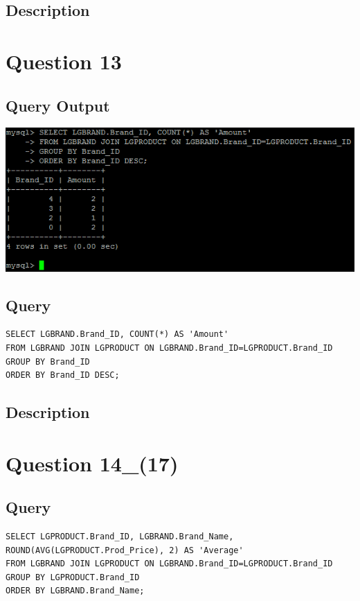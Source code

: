 \documentclass[a4paper,10pt]{article}
\begin{document}
\subsection{Description}
\section*{Question 13}
\subsection{Query Output}
           \includegraphics{Queries/Question_13/Question_13_screenshot.PNG}
 \subsection{Query}
          \lstset{
            language=SQL,
            breaklines=true
            }
        \begin{lstlisting}[frame=single]
        SELECT LGBRAND.Brand_ID, COUNT(*) AS 'Amount'
FROM LGBRAND JOIN LGPRODUCT ON LGBRAND.Brand_ID=LGPRODUCT.Brand_ID
GROUP BY Brand_ID
ORDER BY Brand_ID DESC;

        \end{lstlisting}
\subsection{Description}
\section*{Question 14_(17)}
 \subsection{Query}
          \lstset{
            language=SQL,
            breaklines=true
            }
        \begin{lstlisting}[frame=single]
        SELECT LGPRODUCT.Brand_ID, LGBRAND.Brand_Name, ROUND(AVG(LGPRODUCT.Prod_Price), 2) AS 'Average'
FROM LGBRAND JOIN LGPRODUCT ON LGBRAND.Brand_ID=LGPRODUCT.Brand_ID
GROUP BY LGPRODUCT.Brand_ID
ORDER BY LGBRAND.Brand_Name;

        \end{lstlisting}
\end{document}
